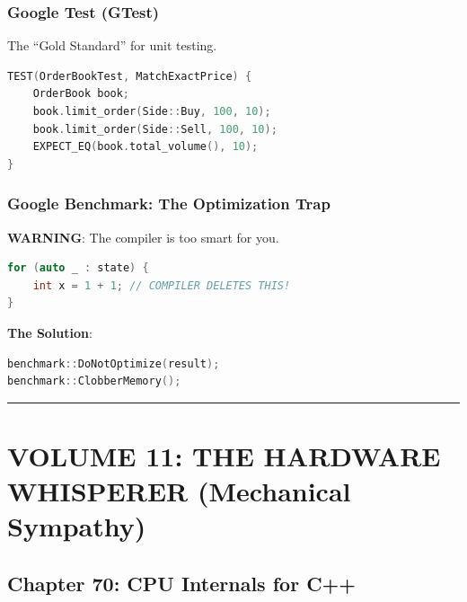 \hypertarget{google-test-gtest}{%
\subsubsection{Google Test (GTest)}\label{google-test-gtest}}

The ``Gold Standard'' for unit testing.

\begin{lstlisting}[language={C++}]
TEST(OrderBookTest, MatchExactPrice) {
    OrderBook book;
    book.limit_order(Side::Buy, 100, 10);
    book.limit_order(Side::Sell, 100, 10);
    EXPECT_EQ(book.total_volume(), 10);
}
\end{lstlisting}

\hypertarget{google-benchmark-the-optimization-trap}{%
\subsubsection{Google Benchmark: The Optimization
Trap}\label{google-benchmark-the-optimization-trap}}

\textbf{WARNING}: The compiler is too smart for you.

\begin{lstlisting}[language={C++}]
for (auto _ : state) {
    int x = 1 + 1; // COMPILER DELETES THIS!
}
\end{lstlisting}

\textbf{The Solution}:

\begin{lstlisting}[language={C++}]
benchmark::DoNotOptimize(result);
benchmark::ClobberMemory();
\end{lstlisting}

\begin{center}\rule{0.5\linewidth}{0.5pt}\end{center}

\hypertarget{volume-11-the-hardware-whisperer-mechanical-sympathy}{%
\section{VOLUME 11: THE HARDWARE WHISPERER (Mechanical
Sympathy)}\label{volume-11-the-hardware-whisperer-mechanical-sympathy}}

\hypertarget{chapter-70-cpu-internals-for-c}{%
\subsection{Chapter 70: CPU Internals for
C++}\label{chapter-70-cpu-internals-for-c}}

